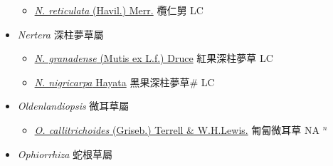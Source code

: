\begin{itemize}
  \begin{itemize}
        \item[] \href{http://www.theplantlist.org/tpl1.1/search?q=Neonauclea+reticulata}{\textit{N. reticulata} (Havil.) Merr.}   欖仁舅 LC
  \end{itemize}
 \item[] \textit{Nertera} 深柱夢草屬
                    
  \begin{itemize}
        \item[] \href{http://www.theplantlist.org/tpl1.1/search?q=Nertera+granadense}{\textit{N. granadense} (Mutis ex L.f.) Druce}   紅果深柱夢草 LC
        \item[] \href{http://www.theplantlist.org/tpl1.1/search?q=Nertera+nigricarpa}{\textit{N. nigricarpa} Hayata}   黑果深柱夢草\# LC
  \end{itemize}
 \item[] \textit{Oldenlandiopsis} 微耳草屬 
                    
  \begin{itemize}
        \item[] \href{http://www.theplantlist.org/tpl1.1/search?q=Oldenlandiopsis+callitrichoides}{\textit{O. callitrichoides} (Griseb.) Terrell \& W.H.Lewis.}   匍匐微耳草 NA $^n$
  \end{itemize}
 \item[] \textit{Ophiorrhiza} 蛇根草屬
                    

\end{itemize}
